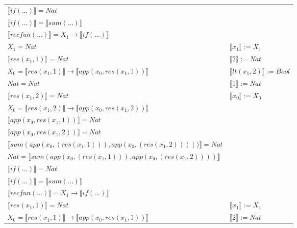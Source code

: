 \begin{exercise}
\begin{description}
\begin{center}
\begin{longtable}[!h]{ | l | l | }
                        $ \llbracket if(...) \rrbracket = Nat$ & \\
                        $ \llbracket if(...) \rrbracket =  \llbracket sum(...) \rrbracket$ & \\
                        $ \llbracket recfun(...) \rrbracket =   X_1  \to  \llbracket if(...) \rrbracket $  & \\
                    \hline
                        $X_1 = Nat$ &  $ \llbracket x_1 \rrbracket := X_1$ \\
                        $ \llbracket res(x_1,1) \rrbracket = Nat$ & $ \llbracket 2 \rrbracket := Nat$ \\
                        $X_0 =  \llbracket res(x_1,1) \rrbracket \to  \llbracket app(x_0, res(x_1,1)) \rrbracket$ &  $ \llbracket lt(x_1 , 2) \rrbracket := Bool$ \\
                        $Nat = Nat$ & $ \llbracket 1 \rrbracket := Nat$ \\
                        $ \llbracket res(x_1,2) \rrbracket = Nat$ & $ \llbracket x_0 \rrbracket := X_0$ \\
                        $X_0 =  \llbracket res(x_1,2) \rrbracket \to  \llbracket app(x_0, res(x_1,2)) \rrbracket$ &  \\
                        $ \llbracket app(x_0, res(x_1,1)) \rrbracket = Nat$ & \\
                        $ \llbracket app(x_0, res(x_1,2)) \rrbracket = Nat$ & \\
                        $ \llbracket sum(app(x_0, (res(x_1,1))), app(x_0, (res(x_1,2)))) ) \rrbracket = Nat$ & \\
                        $Nat =  \llbracket sum(app(x_0, (res(x_1,1))), app(x_0, (res(x_1,2)))) \rrbracket$ & \\
                        $ \llbracket if(...) \rrbracket = Nat$ & \\
                        $ \llbracket if(...) \rrbracket =  \llbracket sum(...) \rrbracket$ & \\
                        $ \llbracket recfun(...) \rrbracket =   X_1  \to  \llbracket if(...) \rrbracket $ & \\
                    \hline 
                        $ \llbracket res(x_1,1) \rrbracket = Nat$ &  $ \llbracket x_1 \rrbracket := X_1$ \\
                        $X_0 =  \llbracket res(x_1,1) \rrbracket \to  \llbracket app(x_0, res(x_1,1)) \rrbracket$ & $ \llbracket 2 \rrbracket := Nat$ \\

\end{longtable}
\end{center}
\end{description}
\end{exercise}
